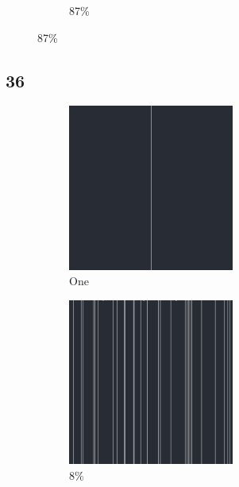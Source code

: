 \documentclass[12pt, fleqn]{report}                             %
\theoremstyle{break}                                            %
\begin{document}
\begin{figure}[ht!]
\begin{subfigure}[b]{0.4\linewidth}
          \caption{87\%}
        \end{subfigure}
      \end{figure}


      \clearpage
      \subsection{36}
      \begin{figure}[ht!]
        \centering
        \begin{subfigure}[b]{0.4\linewidth}
          \includegraphics[width=0.6\textwidth]{Images/36/a.png}
          \caption{One}
        \end{subfigure}
        \begin{subfigure}[b]{0.4\linewidth}
          \includegraphics[width=0.6\textwidth]{Images/36/b.png}
          \caption{8\%}
        \end{subfigure}
        \begin{subfigure}[b]{0.4\linewidth}

\end{subfigure}
\end{figure}
\end{document}
